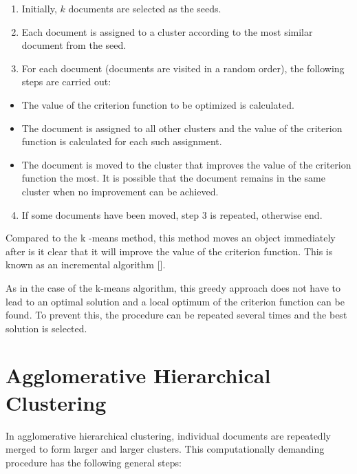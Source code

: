 \begin{enumerate}
  \item Initially, $k$ documents are selected as the seeds.
  \item Each document is assigned to a cluster according to the most similar document from the seed.
  \item For each document (documents are visited in a random order), the following steps are carried out:
\end{enumerate}

\begin{itemize}
  \item The value of the criterion function to be optimized is calculated.
  \item The document is assigned to all other clusters and the value of the criterion function is calculated for each such assignment.
  \item The document is moved to the cluster that improves the value of the criterion function the most. It is possible that the document remains in the same cluster when no improvement can be achieved.
\end{itemize}

\begin{enumerate}
  \setcounter{enumi}{3}
  \item If some documents have been moved, step 3 is repeated, otherwise end.
\end{enumerate}

Compared to the k -means method, this method moves an object immediately after is it clear that it will improve the value of the criterion function. This is known as an incremental algorithm [\cite{ref294}].

As in the case of the k-means algorithm, this greedy approach does not have to lead to an optimal solution and a local optimum of the criterion function can be found. To prevent this, the procedure can be repeated several times and the best solution is selected.

\section{Agglomerative Hierarchical Clustering}

In agglomerative hierarchical clustering, individual documents are repeatedly merged to form larger and larger clusters. This computationally demanding procedure has the following general steps:

